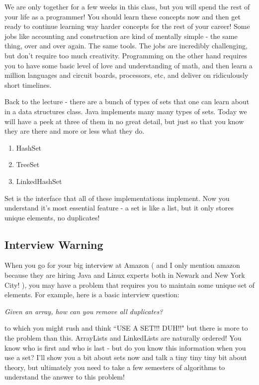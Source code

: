 \documentclass[12pt]{article}
\begin{document}
We are only together for a few weeks in this class, but you will spend the rest of your life as a programmer! You should learn these concepts now and then get ready to continue learning way harder concepts for the rest of your career! Some jobs like accounting and construction are kind of mentally simple - the same thing, over and over again. The same tools. The jobs are incredibly challenging, but don't require too much creativity. Programming on the other hand requires you to have some basic level of love and understanding of math, and then learn a million languages and circuit boards, processors, etc, and deliver on ridiculously short timelines. 

Back to the lecture - there are a bunch of types of sets that one can learn about in a data structures class. Java implements many many types of sets. Today we will have a peek at three of them in no great detail, but just so that you know they are there and more or less what they do.

\begin{enumerate}
\item HashSet
\item TreeSet
\item LinkedHashSet
\end{enumerate}

Set is the interface that all of these implementations implement. Now you understand it's most essential feature - a set is like a list, but it only stores unique elements, no duplicates! 

\subsection{Interview Warning}
When you go for your big interview at Amazon ( and I only mention amazon because they are hiring Java and Linux experts both in Newark and New York City! ), you may have a problem that requires you to maintain some unique set of elements. For example, here is a basic interview question:

{\Large\textit{Given an array, how can you remove all duplicates?}}

to which you might rush and think ``USE A SET!!! DUH!!" but there is more to the problem than this. ArrayLists and LinkedLists are naturally ordered! You know who is first and who is last - but do you know this information when you use a set? I'll show you a bit about sets now and talk a tiny tiny tiny bit about theory, but ultimately you need to take a few semesters of algorithms to understand the answer to this problem!
\end{document}
